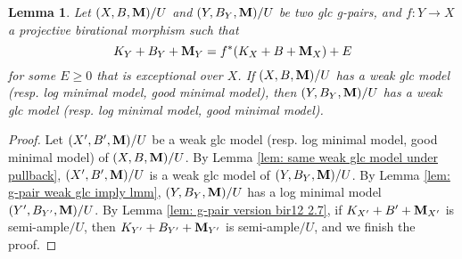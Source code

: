 \documentclass[11pt]{amsart}
\numberwithin{equation}{section}
\newcommand{\Mm}{{\bf{M}}}
\newtheorem{lem}[thm]{Lemma}
\theoremstyle{definition}
\theoremstyle{definition}
\theoremstyle{definition}
\begin{document}
\begin{lem}\label{lem: existence good minimal model under pullback}
Let $(X,B,\Mm)/U$ and $(Y,B_Y,\Mm)/U$ be two glc g-pairs, and $f: Y\rightarrow X$ a projective birational morphism such that
$$K_Y+B_Y+\Mm_Y=f^*(K_X+B+\Mm_X)+E$$
for some $E\geq 0$ that is exceptional over $X$. If $(X,B,\Mm)/U$ has a weak glc model (resp. log minimal model, good minimal model), then $(Y,B_Y,\Mm)/U$ has a weak glc model (resp. log minimal model, good minimal model).
\end{lem}
\begin{proof}
Let $(X',B',\Mm)/U$ be a weak glc model (resp. log minimal model, good minimal model) of $(X,B,\Mm)/U$. By Lemma \ref{lem: same weak glc model under pullback}, $(X',B',\Mm)/U$ is a weak glc model of $(Y,B_Y,\Mm)/U$. By Lemma \ref{lem: g-pair weak glc imply lmm}, $(Y,B_Y,\Mm)/U$ has a log minimal model $(Y',B_{Y'},\Mm)/U$. By Lemma \ref{lem: g-pair version bir12 2.7}, if $K_{X'}+B'+\Mm_{X'}$ is semi-ample$/U$, then $K_{Y'}+B_{Y'}+\Mm_{Y'}$ is semi-ample$/U$, and we finish the proof.
\end{proof}
\end{document}
